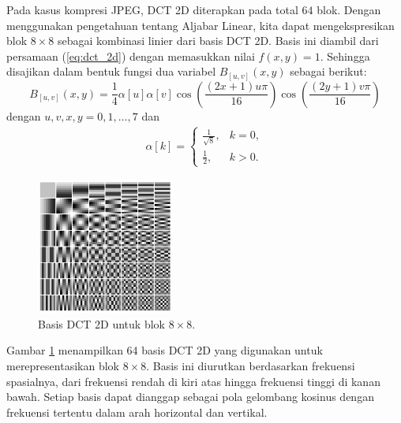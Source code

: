\documentclass[a4paper]{article}
\begin{document}
Pada kasus kompresi JPEG, DCT 2D diterapkan pada total $64$ blok. Dengan menggunakan pengetahuan tentang Aljabar Linear, kita dapat mengekspresikan blok $8 \times 8$ sebagai kombinasi linier dari basis DCT 2D. Basis ini diambil dari persamaan (\ref{eq:dct_2d}) dengan memasukkan nilai $f(x,y)=1$. Sehingga disajikan dalam bentuk fungsi dua variabel $B_{[u,v]}(x,y)$ sebagai berikut:
\begin{equation}
  B_{[u,v]}(x,y) = \frac{1}{4} \alpha[u] \alpha[v] \cos\left(\frac{(2x+1)u\pi}{16}\right) \cos\left(\frac{(2y+1)v\pi}{16}\right)
\end{equation}
dengan $u,v,x,y = 0,1,\ldots,7$ dan
\begin{align}
  \alpha[k] =
  \begin{cases}
    \frac{1}{\sqrt{8}}, & k = 0, \\
    \frac{1}{2},        & k > 0.
  \end{cases}
\end{align}

\begin{figure}[h]
  \centering
  \includegraphics[width=0.4\textwidth]{img/DCTbasis.png}
  \caption{Basis DCT 2D untuk blok $8 \times 8$.}
  \label{fig:dct_basis}
\end{figure}

Gambar \ref{fig:dct_basis} menampilkan 64 basis DCT 2D yang digunakan untuk merepresentasikan blok $8 \times 8$. Basis ini diurutkan berdasarkan frekuensi spasialnya, dari frekuensi rendah di kiri atas hingga frekuensi tinggi di kanan bawah. Setiap basis dapat dianggap sebagai pola gelombang kosinus dengan frekuensi tertentu dalam arah horizontal dan vertikal.
\end{document}
